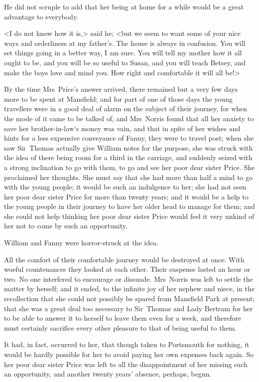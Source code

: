He did not scruple to add that her being at home for a while would be a great advantage to everybody.

<I do not know how it is,> said he; <but we seem to want some of your nice ways and orderliness at my father's. The house is always in confusion. You will set things going in a better way, I am sure. You will tell my mother how it all ought to be, and you will be so useful to Susan, and you will teach Betsey, and make the boys love and mind you. How right and comfortable it will all be!>

By the time Mrs~Price's answer arrived, there remained but a very few days more to be spent at Mansfield; and for part of one of those days the young travellers were in a good deal of alarm on the subject of their journey, for when the mode of it came to be talked of, and Mrs~Norris found that all her anxiety to save her brother-in-law's money was vain, and that in spite of her wishes and hints for a less expensive conveyance of Fanny, they were to travel post; when she saw Sir~Thomas actually give William notes for the purpose, she was struck with the idea of there being room for a third in the carriage, and suddenly seized with a strong inclination to go with them, to go and see her poor dear sister Price. She proclaimed her thoughts. She must say that she had more than half a mind to go with the young people; it would be such an indulgence to her; she had not seen her poor dear sister Price for more than twenty years; and it would be a help to the young people in their journey to have her older head to manage for them; and she could not help thinking her poor dear sister Price would feel it very unkind of her not to come by such an opportunity.

William and Fanny were horror-struck at the idea.

All the comfort of their comfortable journey would be destroyed at once. With woeful countenances they looked at each other. Their suspense lasted an hour or two. No one interfered to encourage or dissuade. Mrs~Norris was left to settle the matter by herself; and it ended, to the infinite joy of her nephew and niece, in the recollection that she could not possibly be spared from Mansfield Park at present; that she was a great deal too necessary to Sir~Thomas and Lady Bertram for her to be able to answer it to herself to leave them even for a week, and therefore must certainly sacrifice every other pleasure to that of being useful to them.

It had, in fact, occurred to her, that though taken to Portsmouth for nothing, it would be hardly possible for her to avoid paying her own expenses back again. So her poor dear sister Price was left to all the disappointment of her missing such an opportunity, and another twenty years' absence, perhaps, begun.

